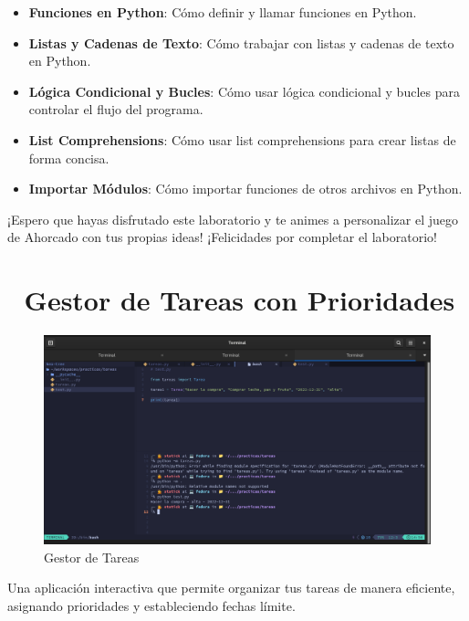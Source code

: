 \documentclass[
  a4paper,
  DIV=11,
  numbers=noendperiod,
  onepage,
  openany]{scrreprt}
\begin{document}
\begin{itemize}
\item
  \textbf{Funciones en Python}: Cómo definir y llamar funciones en
  Python.
\item
  \textbf{Listas y Cadenas de Texto}: Cómo trabajar con listas y cadenas
  de texto en Python.
\item
  \textbf{Lógica Condicional y Bucles}: Cómo usar lógica condicional y
  bucles para controlar el flujo del programa.
\item
  \textbf{List Comprehensions}: Cómo usar list comprehensions para crear
  listas de forma concisa.
\item
  \textbf{Importar Módulos}: Cómo importar funciones de otros archivos
  en Python.
\end{itemize}

¡Espero que hayas disfrutado este laboratorio y te animes a personalizar
el juego de Ahorcado con tus propias ideas! ¡Felicidades por completar
el laboratorio!

\chapter{📝 Gestor de Tareas con
Prioridades}\label{gestor-de-tareas-con-prioridades}

\begin{figure}[H]

{\centering \includegraphics{unidades/Proyectos/images/proyecto_modulos.png}

}

\caption{Gestor de Tareas}

\end{figure}%

Una aplicación interactiva que permite organizar tus tareas de manera
eficiente, asignando prioridades y estableciendo fechas límite.
\end{document}
